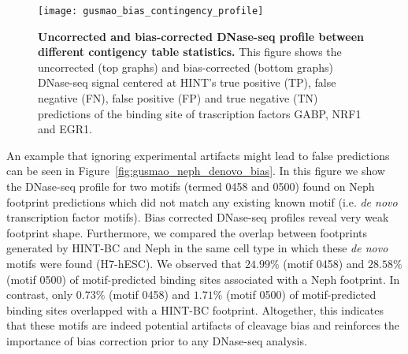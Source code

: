 \begin{figure}[h!]
\centering
\texttt{[image: gusmao\_bias\_contingency\_profile]}
\caption[Uncorrected and bias-corrected DNase-seq profile between different contigency table statistics]{\textbf{Uncorrected and bias-corrected DNase-seq profile between different contigency table statistics.} This figure shows the uncorrected (top graphs) and bias-corrected (bottom graphs) DNase-seq signal centered at HINT's true positive (TP), false negative (FN), false positive (FP) and true negative (TN) predictions of the binding site of trascription factors GABP, NRF1 and EGR1.}
\label{fig:gusmao_bias_contingency_profile}
\end{figure}

An example that ignoring experimental artifacts might lead to false predictions can be seen in Figure~\ref{fig:gusmao_neph_denovo_bias}. In this figure we show the DNase-seq profile for two motifs (termed 0458 and 0500) found on Neph footprint predictions which did not match any existing known motif (i.e. \emph{de novo} transcription factor motifs). Bias corrected DNase-seq profiles reveal very weak footprint shape. Furthermore, we compared the overlap between footprints generated by HINT-BC and Neph in the same cell type in which these \emph{de novo} motifs were found (H7-hESC). We observed that $24.99\%$ (motif 0458) and $28.58\%$ (motif 0500) of motif-predicted binding sites associated with a Neph footprint. In contrast, only $0.73\%$ (motif 0458) and $1.71\%$ (motif 0500) of motif-predicted binding sites overlapped with a HINT-BC footprint. Altogether, this indicates that these motifs are indeed potential artifacts of cleavage bias and reinforces the importance of bias correction prior to any DNase-seq analysis.

